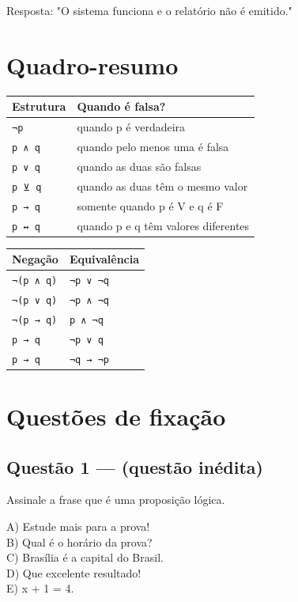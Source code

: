 \documentclass[11pt,a4paper]{article}
\begin{document}
Resposta: "O sistema funciona e o relatório não é emitido."

\section*{Quadro-resumo}

\begin{tabularx}{\linewidth}{lX}
\toprule
 \textbf{Estrutura} & \textbf{Quando é falsa?} \\
\midrule
 \texttt{¬p} & quando p é verdadeira \\
 \texttt{p ∧ q} & quando pelo menos uma é falsa \\
 \texttt{p ∨ q} & quando as duas são falsas \\
 \texttt{p ⊻ q} & quando as duas têm o mesmo valor \\
 \texttt{p → q} & somente quando p é V e q é F \\
 \texttt{p ↔ q} & quando p e q têm valores diferentes \\
\bottomrule
\end{tabularx}


\begin{tabularx}{\linewidth}{lX}
\toprule
 \textbf{Negação} & \textbf{Equivalência} \\
\midrule
 \texttt{¬(p ∧ q)} & \texttt{¬p ∨ ¬q} \\
 \texttt{¬(p ∨ q)} & \texttt{¬p ∧ ¬q} \\
 \texttt{¬(p → q)} & \texttt{p ∧ ¬q} \\
 \texttt{p → q} & \texttt{¬p ∨ q} \\
 \texttt{p → q} & \texttt{¬q → ¬p} \\
\bottomrule
\end{tabularx}


\section*{Questões de fixação}

\subsection*{Questão 1 — (questão inédita)}

Assinale a frase que é uma proposição lógica.

A) Estude mais para a prova! \\ B) Qual é o horário da prova? \\ C) Brasília é a capital do Brasil. \\ D) Que excelente resultado! \\ E) x + 1 = 4.
\end{document}
